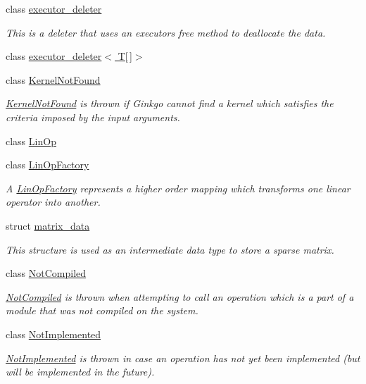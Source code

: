 \begin{DoxyCompactItemize}
class \hyperlink{classgko_1_1executor__deleter}{executor\+\_\+deleter}
\begin{DoxyCompactList}\small\item\em This is a deleter that uses an executor\textquotesingle{}s {\ttfamily free} method to deallocate the data. \end{DoxyCompactList}\item 
class \hyperlink{classgko_1_1executor__deleter_3_01T[]_4}{executor\+\_\+deleter$<$ T\mbox{[}$\,$\mbox{]}$>$}
\item 
class \hyperlink{classgko_1_1KernelNotFound}{Kernel\+Not\+Found}
\begin{DoxyCompactList}\small\item\em \hyperlink{classgko_1_1KernelNotFound}{Kernel\+Not\+Found} is thrown if Ginkgo cannot find a kernel which satisfies the criteria imposed by the input arguments. \end{DoxyCompactList}\item 
class \hyperlink{classgko_1_1LinOp}{Lin\+Op}
\item 
class \hyperlink{classgko_1_1LinOpFactory}{Lin\+Op\+Factory}
\begin{DoxyCompactList}\small\item\em A \hyperlink{classgko_1_1LinOpFactory}{Lin\+Op\+Factory} represents a higher order mapping which transforms one linear operator into another. \end{DoxyCompactList}\item 
struct \hyperlink{structgko_1_1matrix__data}{matrix\+\_\+data}
\begin{DoxyCompactList}\small\item\em This structure is used as an intermediate data type to store a sparse matrix. \end{DoxyCompactList}\item 
class \hyperlink{classgko_1_1NotCompiled}{Not\+Compiled}
\begin{DoxyCompactList}\small\item\em \hyperlink{classgko_1_1NotCompiled}{Not\+Compiled} is thrown when attempting to call an operation which is a part of a module that was not compiled on the system. \end{DoxyCompactList}\item 
class \hyperlink{classgko_1_1NotImplemented}{Not\+Implemented}
\begin{DoxyCompactList}\small\item\em \hyperlink{classgko_1_1NotImplemented}{Not\+Implemented} is thrown in case an operation has not yet been implemented (but will be implemented in the future). \end{DoxyCompactList}\item 

\end{DoxyCompactItemize}
